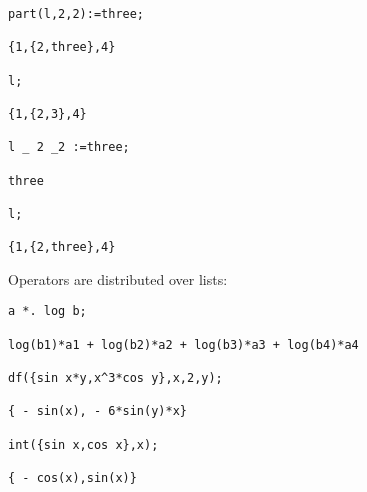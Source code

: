 \begin{verbatim}
part(l,2,2):=three;

{1,{2,three},4}

l;

{1,{2,3},4}

l _ 2 _2 :=three;

three

l;

{1,{2,three},4}
\end{verbatim}
Operators are distributed over lists:
\begin{verbatim}
a *. log b;

log(b1)*a1 + log(b2)*a2 + log(b3)*a3 + log(b4)*a4

df({sin x*y,x^3*cos y},x,2,y);

{ - sin(x), - 6*sin(y)*x}

int({sin x,cos x},x);

{ - cos(x),sin(x)}
\end{verbatim}
